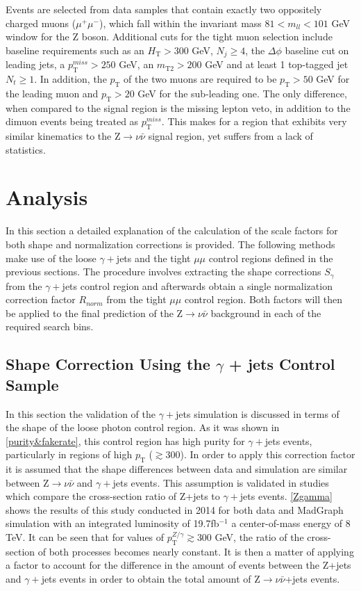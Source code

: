 Events are selected from data samples that contain exactly two oppositely charged muons ($\mu^{+}\mu^{-}$), which fall within the invariant mass $81 < m_{ll} < 101$ GeV window for the Z boson. Additional cuts for the tight muon selection include baseline requirements such as an $H_\text{T} > 300$ GeV, $N_j \geq 4$, the $\Delta\phi$ baseline cut on leading jets, a $p_\text{T}^{miss} > 250$ GeV, an $m_\text{T2} > 200$ GeV and at least 1 top-tagged jet $N_t \geq 1$. In addition, the $p_\text{T}$ of the two muons are required to be $p_\text{T} > 50$ GeV for the leading muon and $p_\text{T} > 20$ GeV for the sub-leading one. The only difference, when compared to the signal region is the missing lepton veto, in addition to the dimuon events being treated as $p_\text{T}^{miss}$. This makes for a region that exhibits very similar kinematics to the Z$\rightarrow\nu\bar{\nu}$ signal region, yet suffers from a lack of statistics.

\section{Analysis}

In this section a detailed explanation of the calculation of the scale factors for both shape and normalization corrections is provided. The following methods make use of the loose $\gamma+$jets and the tight $\mu\mu$ control regions defined in the previous sections. The procedure involves extracting the shape corrections $S_\gamma$ from the $\gamma+$jets control region and afterwards obtain a single normalization correction factor $R_{norm}$ from the tight $\mu\mu$ control region. Both factors will then be applied to the final prediction of the Z$\rightarrow\nu\bar{\nu}$ background in each of the required search bins. 

\subsection{Shape Correction Using the $\gamma$ + jets Control Sample}

In this section the validation of the $\gamma+$jets simulation is discussed in terms of the shape of the loose photon control region. As it was shown in \autoref{purity&fakerate}, this control region has high purity for $\gamma+$jets events, particularly in regions of high $p_\text{T}$ ($\gtrsim 300$). In order to apply this correction factor it is assumed that the shape differences between data and simulation are similar between Z$\rightarrow\nu\bar{\nu}$ and $\gamma+$jets events. This assumption is validated in studies which compare the cross-section ratio of Z+jets to $\gamma+$jets events\cite{ZtoGamma}. \autoref{Zgamma} shows the results of this study conducted in 2014 for both data and MadGraph simulation with an integrated luminosity of 19.7fb$^{-1}$ a center-of-mass energy of 8 TeV. It can be seen that for values of $p_\text{T}^{Z/\gamma} \gtrsim 300$ GeV, the ratio of the cross-section of both processes becomes nearly constant. It is then a matter of applying a factor to account for the difference in the amount of events between the Z+jets and $\gamma+$jets events in order to obtain the total amount of Z$\rightarrow\nu\bar{\nu}$+jets events.

